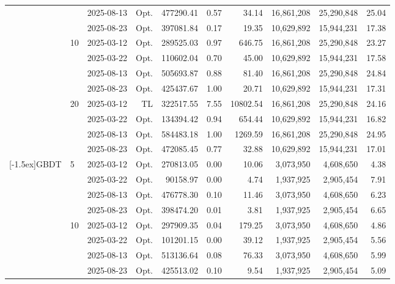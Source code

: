 \begin{table}[!h]
\begin{tabular}{llrrrrrrrr}
             &  & 2025-08-13 & Opt. & 477290.41 & 0.57 & 34.14 & 16,861,208 & 25,290,848 & 25.04 \\
             &  & 2025-08-23 & Opt. & 397081.84 & 0.17 & 19.35 & 10,629,892 & 15,944,231 & 17.38 \\
            \addlinespace
             & \multirow{4}{*}{10} & 2025-03-12 & Opt. & 289525.03 & 0.97 & 646.75 & 16,861,208 & 25,290,848 & 23.27 \\
             &  & 2025-03-22 & Opt. & 110602.04 & 0.70 & 45.00 & 10,629,892 & 15,944,231 & 17.58 \\
             &  & 2025-08-13 & Opt. & 505693.87 & 0.88 & 81.40 & 16,861,208 & 25,290,848 & 24.84 \\
             &  & 2025-08-23 & Opt. & 425437.67 & 1.00 & 20.71 & 10,629,892 & 15,944,231 & 17.31 \\
            \addlinespace
             & \multirow{4}{*}{20} & 2025-03-12 & TL & 322517.55 & 7.55 & 10802.54 & 16,861,208 & 25,290,848 & 24.16 \\
             &  & 2025-03-22 & Opt. & 134394.42 & 0.94 & 654.44 & 10,629,892 & 15,944,231 & 16.82 \\
             &  & 2025-08-13 & Opt. & 584483.18 & 1.00 & 1269.59 & 16,861,208 & 25,290,848 & 24.95 \\
             &  & 2025-08-23 & Opt. & 472085.45 & 0.77 & 32.88 & 10,629,892 & 15,944,231 & 17.01 \\
            \addlinespace
            \midrule
            \multirow{12}{*}[-1.5ex]{GBDT} & \multirow{4}{*}{5} & 2025-03-12 & Opt. & 270813.05 & 0.00 & 10.06 & 3,073,950 & 4,608,650 & 4.38 \\
             &  & 2025-03-22 & Opt. & 90158.97 & 0.00 & 4.74 & 1,937,925 & 2,905,454 & 7.91 \\
             &  & 2025-08-13 & Opt. & 476778.30 & 0.10 & 11.46 & 3,073,950 & 4,608,650 & 6.23 \\
             &  & 2025-08-23 & Opt. & 398474.20 & 0.01 & 3.81 & 1,937,925 & 2,905,454 & 6.65 \\
            \addlinespace
             & \multirow{4}{*}{10} & 2025-03-12 & Opt. & 297909.35 & 0.04 & 179.25 & 3,073,950 & 4,608,650 & 4.86 \\
             &  & 2025-03-22 & Opt. & 101201.15 & 0.00 & 39.12 & 1,937,925 & 2,905,454 & 5.56 \\
             &  & 2025-08-13 & Opt. & 513136.64 & 0.08 & 76.33 & 3,073,950 & 4,608,650 & 5.99 \\
             &  & 2025-08-23 & Opt. & 425513.02 & 0.10 & 9.54 & 1,937,925 & 2,905,454 & 5.09 \\

\end{tabular}
\end{table}
